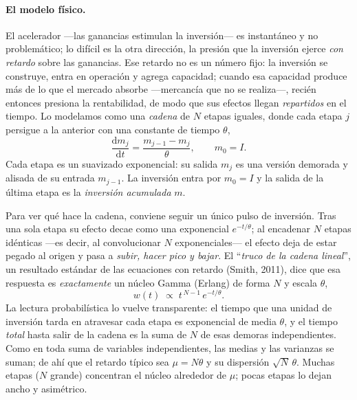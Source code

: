 \documentclass[11pt]{article}
\begin{document}
\paragraph{El modelo físico.} El acelerador ---las ganancias estimulan la inversión--- es
instantáneo y no problemático; lo difícil es la otra dirección, la presión que la inversión ejerce
\emph{con retardo} sobre las ganancias. Ese retardo no es un número fijo: la inversión se construye,
entra en operación y agrega capacidad; cuando esa capacidad produce más de lo que el mercado absorbe
---mercancía que no se realiza---, recién entonces presiona la rentabilidad, de modo que sus efectos
llegan \emph{repartidos} en el tiempo. Lo modelamos como una \emph{cadena} de $N$ etapas
iguales, donde cada etapa $j$ persigue a la anterior con una constante de tiempo $\theta$,
\[
\frac{\mathrm{d}m_j}{\mathrm{d}t}=\frac{m_{j-1}-m_j}{\theta},\qquad m_0=I.
\]
Cada etapa es un suavizado exponencial: su salida $m_j$ es una versión demorada y alisada de su
entrada $m_{j-1}$. La inversión entra por $m_0=I$ y la salida de la última etapa es la
\emph{inversión acumulada} $m$.

Para ver qué hace la cadena, conviene seguir un único pulso de inversión. Tras una sola etapa su
efecto decae como una exponencial $e^{-t/\theta}$; al encadenar $N$ etapas idénticas ---es decir, al
convolucionar $N$ exponenciales--- el efecto deja de estar pegado al origen y pasa a \emph{subir,
hacer pico y bajar}. El ``\emph{truco de la cadena lineal}'', un resultado estándar de las ecuaciones
con retardo (Smith, 2011), dice que esa respuesta es \emph{exactamente} un núcleo Gamma (Erlang) de forma $N$ y
escala $\theta$,
\[
w(t)\;\propto\;t^{\,N-1}\,e^{-t/\theta}.
\]
La lectura probabilística lo vuelve transparente: el tiempo que una unidad de inversión tarda en
atravesar cada etapa es exponencial de media $\theta$, y el tiempo \emph{total} hasta salir de la
cadena es la suma de $N$ de esas demoras independientes. Como en toda suma de variables
independientes, las medias y las varianzas se suman; de ahí que el retardo típico sea $\mu=N\theta$ y
su dispersión $\sqrt{N}\,\theta$. Muchas etapas ($N$ grande) concentran el núcleo alrededor de
$\mu$; pocas etapas lo dejan ancho y asimétrico.
\end{document}
